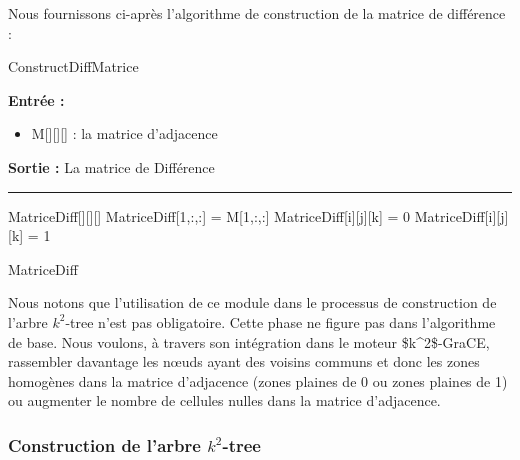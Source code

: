 \documentclass[a4paper,oneside,12pt]{report}
\theoremstyle{definition}
\begin{document}
Nous fournissons ci-après l'algorithme de construction de la matrice de différence :

	\begin{algorithm}[H]
					
					\caption{ConstructDiffMatrice}
					\label{alg:diffMat}
					\textbf{Entrée :}
						\begin{itemize}[label=$\bullet$]
							\item M[][][] : la matrice d'adjacence
						\end{itemize}
					\textbf{Sortie :} La matrice de Différence\\							\noindent\rule{\textwidth}{1pt}
						
						
				\begin{algorithmic} [1]
					\STATE MatriceDiff[][][]
					\STATE MatriceDiff[1,:,:] = M[1,:,:]
									\STATE MatriceDiff[i][j][k] = 0
								\ELSE
									\STATE MatriceDiff[i][j][k] = 1
								\ENDIF
							\ENDFOR
							
						\ENDFOR
					\ENDFOR
				
					\RETURN MatriceDiff
				\end{algorithmic}
			\end{algorithm}


Nous notons que l'utilisation de ce module dans le processus de construction de l'arbre $k^2$-tree n'est pas obligatoire. Cette phase ne figure pas dans l'algorithme de base. Nous voulons, à travers son intégration dans le moteur \gls{$k^2$-GraCE}, rassembler davantage les nœuds ayant des voisins communs et donc les zones homogènes dans la matrice d'adjacence (zones plaines de 0 ou zones plaines de 1) ou augmenter le nombre de cellules nulles dans la matrice d'adjacence.
		
			\subsubsection{Construction de l'arbre $k^2$-tree}
			
\end{document}
